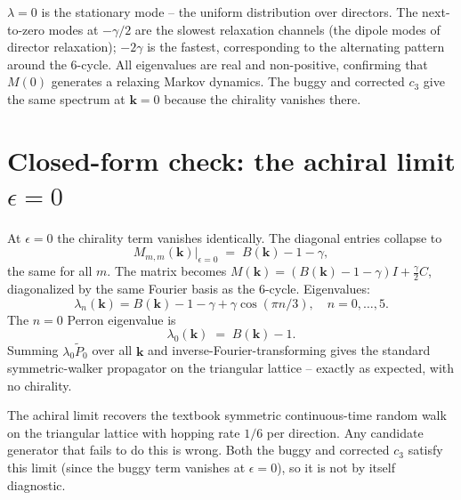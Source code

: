 \documentclass[11pt,a4paper]{article}
\newcommand{\vk}{\mathbf{k}}
\newcommand{\Ptilde}{\widetilde{P}}
\begin{document}
\begin{intuition}
$\lambda = 0$ is the stationary mode -- the uniform distribution over
directors. The next-to-zero modes at $-\gamma/2$ are the slowest
relaxation channels (the dipole modes of director relaxation); $-2\gamma$
is the fastest, corresponding to the alternating pattern around the
6-cycle. All eigenvalues are real and non-positive, confirming that
$M(0)$ generates a relaxing Markov dynamics. The buggy and corrected
$c_3$ give the same spectrum at $\vk = 0$ because the chirality vanishes
there.
\end{intuition}

\section{Closed-form check: the achiral limit $\epsilon = 0$}\label{sec:eps0-check}

At $\epsilon = 0$ the chirality term vanishes identically. The diagonal
entries collapse to
\begin{equation}\label{eq:diag_eps0}
M_{m,m}(\vk)\big|_{\epsilon = 0} \;=\; B(\vk) - 1 - \gamma,
\end{equation}
the same for all $m$. The matrix becomes $M(\vk) = (B(\vk) - 1 - \gamma) I + \tfrac{\gamma}{2} C$,
diagonalized by the same Fourier basis as the 6-cycle. Eigenvalues:
\begin{equation}\label{eq:M_eps0_spec}
\lambda_n(\vk) = B(\vk) - 1 - \gamma + \gamma \cos(\pi n/3), \quad n = 0,\ldots,5.
\end{equation}
The $n = 0$ Perron eigenvalue is
\begin{equation}\label{eq:perron_eps0}
\lambda_0(\vk) \;=\; B(\vk) - 1.
\end{equation}
Summing $\lambda_0 \Ptilde_0$ over all $\vk$ and inverse-Fourier-transforming
gives the standard symmetric-walker propagator on the triangular lattice
-- exactly as expected, with no chirality.

\begin{intuition}[Sanity]
The achiral limit recovers the textbook symmetric continuous-time random
walk on the triangular lattice with hopping rate $1/6$ per direction.
Any candidate generator that fails to do this is wrong. Both the buggy
and corrected $c_3$ satisfy this limit (since the buggy term vanishes at
$\epsilon = 0$), so it is not by itself diagnostic.
\end{intuition}
\end{document}
